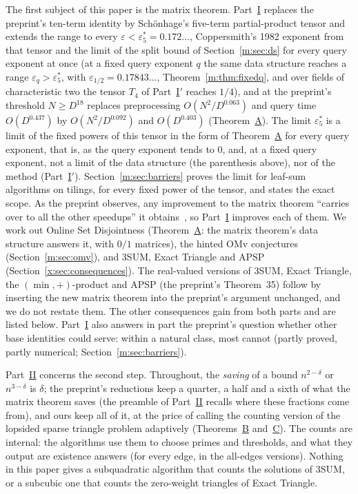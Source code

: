 \documentclass[11pt]{article}
\theoremstyle{definition}
\theoremstyle{remark}
\newcommand{\es}{\varepsilon^*_5}
\newcommand{\HypHalfRfourteen}{0.17843}%
\begin{document}
The first subject of this paper is the matrix theorem. Part~\hyperref[m:partI]{I} replaces the preprint's ten-term identity by Schönhage's five-term partial-product tensor and extends the range to every $\varepsilon<\es=0.172\ldots$, Coppersmith's 1982 exponent from that tensor and the limit of the split bound of Section~\ref{m:sec:ds} for every query exponent at once (at a fixed query exponent $q$ the same data structure reaches a range $\varepsilon_q>\es$, with $\varepsilon_{1/2}=\HypHalfRfourteen\ldots$, Theorem~\ref{m:thm:fixedq}, and over fields of characteristic two the tensor $T_4$ of Part~\hyperref[t:partIp]{I$'$} reaches $1/4$), and at the preprint's threshold $N\ge D^{18}$ replaces preprocessing $O(N^2/D^{0.063})$ and query time $O(D^{0.437})$ by $O(N^2/D^{0.092})$ and $O(D^{0.403})$ (Theorem~\hyperref[m:introA]{A}).
The limit $\es$ is a limit of the fixed powers of this tensor in the form of Theorem~\hyperref[m:introA]{A} for every query exponent, that is, as the query exponent tends to $0$, and, at a fixed query exponent, not a limit of the data structure (the parenthesis above), nor of the method (Part~\hyperref[t:partIp]{I$'$}). Section~\ref{m:sec:barriers} proves the limit for leaf-sum algorithms on tilings, for every fixed power of the tensor, and states the exact scope. As the preprint observes, any improvement to the matrix theorem ``carries over to all the other speedups'' it obtains~\cite[Section~6]{ZT}, so Part~\hyperref[m:partI]{I} improves each of them. We work out Online Set Disjointness (Theorem~\hyperref[m:introA]{A}: the matrix theorem's data structure answers it, with $0/1$ matrices), the hinted OMv conjectures (Section~\ref{m:sec:omv}), and 3SUM, Exact Triangle and APSP (Section~\ref{x:sec:consequences}). The real-valued versions of 3SUM, Exact Triangle, the $(\min,+)$-product and APSP (the preprint's Theorem~35) follow by inserting the new matrix theorem into the preprint's argument unchanged, and we do not restate them. The other consequences gain from both parts and are listed below. Part~\hyperref[m:partI]{I} also answers in part the preprint's question whether other base identities could serve: within a natural class, most cannot (partly proved, partly numerical; Section~\ref{m:sec:barriers}).

Part~\hyperref[m:partII]{II} concerns the second step. Throughout, the \emph{saving} of a bound $n^{2-\delta}$ or $n^{3-\delta}$ is $\delta$; the preprint's reductions keep a quarter, a half and a sixth of what the matrix theorem saves (the preamble of Part~\hyperref[m:partII]{II} recalls where these fractions come from), and ours keep all of it, at the price of calling the counting version of the lopsided sparse triangle problem adaptively (Theorems~\hyperref[m:introB]{B} and~\hyperref[m:introC]{C}).
The counts are internal: the algorithms use them to choose primes and thresholds, and what they output are existence answers (for every edge, in the all-edges versions). Nothing in this paper gives a subquadratic algorithm that counts the solutions of 3SUM, or a subcubic one that counts the zero-weight triangles of Exact Triangle.
\end{document}
